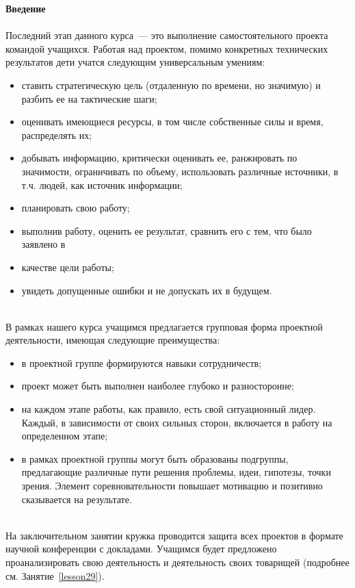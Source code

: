 {\LARGE\bfseries Введение}\\\\

Последний этап данного курса~--- это выполнение самостоятельного проекта командой учащихся. Работая над проектом, помимо конкретных технических результатов дети учатся следующим универсальным умениям:

\begin{itemize}
	\item ставить стратегическую цель (отдаленную по времени, но значимую) и разбить ее на тактические шаги;
	\item оценивать имеющиеся ресурсы, в том числе собственные силы и время, распределять их;
	\item добывать информацию, критически оценивать ее, ранжировать по значимости, ограничивать по объему, использовать различные источники, в т.ч. людей, как источник информации;
	\item планировать свою работу;
	\item выполнив работу, оценить ее результат, сравнить его с тем, что было заявлено в 
	\item качестве цели работы;
	\item увидеть допущенные ошибки и не допускать их в будущем.\\\\
\end{itemize}

В рамках нашего курса учащимся предлагается групповая форма проектной деятельности, имеющая следующие преимущества:

\begin{itemize}
	\item в проектной группе формируются навыки сотрудничеств;
	\item проект может быть выполнен наиболее глубоко и разносторонне;
	\item на каждом этапе работы, как правило, есть свой ситуационный лидер. Каждый, в зависимости от своих сильных сторон, включается в работу на определенном этапе;
	\item в рамках проектной группы могут быть образованы подгруппы, предлагающие различные пути решения проблемы, идеи, гипотезы, точки зрения. Элемент соревновательности повышает мотивацию и позитивно сказывается на результате.\\\\
\end{itemize}

На заключительном занятии кружка проводится защита всех проектов в формате  научной конференции с докладами. Учащимся будет предложено проанализировать свою деятельность и деятельность своих товарищей (подробнее см. Занятие~\ref{lesson29}).

